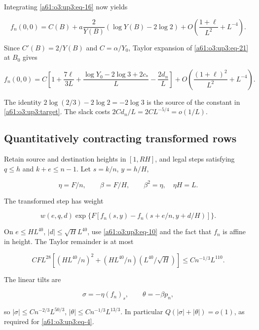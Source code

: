 \documentclass[11pt,letterpaper]{article}
\numberwithin{equation}{section}
\theoremstyle{remark}\newtheorem{remark}[theorem]{Remark}
\begin{document}
Integrating \eqref{a61:o3:up3:eq-16} now yields

\begin{equation}
f_n(0,0)=C(B)+a\frac2{Y(B)}(\log Y(B)-2\log2)
          +O\!\left(\frac{1+\ell}{L^2}+L^{-4}\right).
\label{a61:o3:up3:eq-21}
\end{equation}

Since \(C'(B)=2/Y(B)\) and \(C=\alpha/Y_0\), Taylor expansion of
\eqref{a61:o3:up3:eq-21} at \(B_0\) gives

\begin{equation}
f_n(0,0)=C\left[1+\frac{7\ell}{3L}
                      +\frac{\log Y_0-2\log3+2c_*}{L}
                      -\frac{2d_n}{L}\right]
             +O\!\left(\frac{(1+\ell)^2}{L^2}+L^{-4}\right).
\label{a61:o3:up3:eq-22}
\end{equation}

The identity \(2\log(2/3)-2\log2=-2\log3\) is the source of the constant
in \eqref{a61:o3:up3:target}. The slack costs \(2Cd_n/L=2CL^{-5/4}=o(1/L)\).

\subsection{Quantitatively contracting transformed rows}

Retain source and destination heights in \([1,RH]\), and legal steps
satisfying \(q\le h\) and \(k+e\le n-1\). Let \(s=k/n\), \(y=h/H\),

\[
\eta=F/n,\qquad \beta=F/H,\qquad \beta^2=\eta,\quad \eta H=L.
\]

The transformed step has weight

\begin{equation}
w(e,q,d)\exp\{F[f_n(s,y)-f_n(s+e/n,y+d/H)]\}.
\label{a61:o3:up3:eq-23}
\end{equation}

On \(e\le HL^{40}\), \(|d|\le\sqrt H L^{40}\), use \eqref{a61:o3:up3:eq-10} and
the fact that \(f_n\) is affine in height. The Taylor remainder is at
most

\begin{equation}
CFL^{28}\left[(HL^{40}/n)^2
 +(HL^{40}/n)(L^{40}/\sqrt H)\right]
 \le Cn^{-1/3}L^{110}.
\label{a61:o3:up3:eq-24}
\end{equation}

The linear tilts are

\[
\sigma=-\eta(f_n)_s,\qquad \theta=-\beta p_n,
\]

so \(|\sigma|\le Cn^{-2/3}L^{50/3}\), \(|\theta|\le Cn^{-1/3}L^{13/3}\).
In particular \(Q(|\sigma|+|\theta|)=o(1)\), as required for
\eqref{a61:o3:up3:eq-4}.
\end{document}
